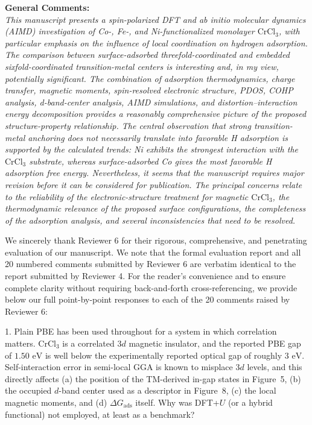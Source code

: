 \documentclass[11pt, sans, a4paper]{moderncv}
\begin{document}
\vspace{0.5em}
\noindent\textbf{General Comments:}\\
\textit{This manuscript presents a spin-polarized DFT and ab initio molecular dynamics (AIMD) investigation of Co-, Fe-, and Ni-functionalized monolayer $\text{CrCl}_3$, with particular emphasis on the influence of local coordination on hydrogen adsorption. The comparison between surface-adsorbed threefold-coordinated and embedded sixfold-coordinated transition-metal centers is interesting and, in my view, potentially significant. The combination of adsorption thermodynamics, charge transfer, magnetic moments, spin-resolved electronic structure, PDOS, COHP analysis, d-band-center analysis, AIMD simulations, and distortion–interaction energy decomposition provides a reasonably comprehensive picture of the proposed structure-property relationship. The central observation that strong transition-metal anchoring does not necessarily translate into favorable H adsorption is supported by the calculated trends: Ni exhibits the strongest interaction with the $\text{CrCl}_3$ substrate, whereas surface-adsorbed Co gives the most favorable H adsorption free energy.
Nevertheless, it seems that the manuscript requires major revision before it can be considered for publication. The principal concerns relate to the reliability of the electronic-structure treatment for magnetic $\text{CrCl}_3$, the thermodynamic relevance of the proposed surface configurations, the completeness of the adsorption analysis, and several inconsistencies that need to be resolved.}

\vspace{0.5em}
\noindent We sincerely thank Reviewer 6 for their rigorous, comprehensive, and penetrating evaluation of our manuscript. We note that the formal evaluation report and all 20 numbered comments submitted by Reviewer 6 are verbatim identical to the report submitted by Reviewer 4. For the reader's convenience and to ensure complete clarity without requiring back-and-forth cross-referencing, we provide below our full point-by-point responses to each of the 20 comments raised by Reviewer 6:

\vspace{1em}

\begin{reviewercomment}
1. Plain PBE has been used throughout for a system in which correlation matters. $\text{CrCl}_3$ is a correlated $3d$ magnetic insulator, and the reported PBE gap of $1.50\text{ eV}$ is well below the experimentally reported optical gap of roughly $3\text{ eV}$. Self-interaction error in semi-local GGA is known to misplace $3d$ levels, and this directly affects (a) the position of the TM-derived in-gap states in Figure~5, (b) the occupied $d$-band center used as a descriptor in Figure~8, (c) the local magnetic moments, and (d) $\Delta G_{\mathrm{ads}}$ itself. Why was DFT+$U$ (or a hybrid functional) not employed, at least as a benchmark?
\end{reviewercomment}
\end{document}
